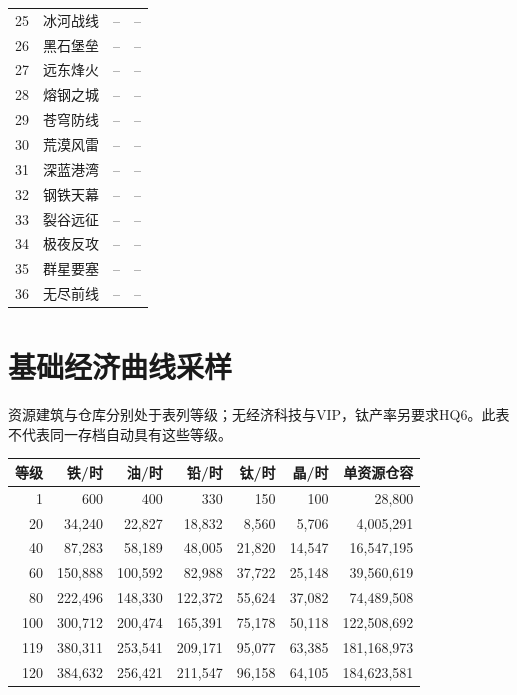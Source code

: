 {\begin{small}
\begin{longtable}{@{}rP{48mm}P{24mm}P{48mm}@{}}
25 & 冰河战线 & -- & -- \\
26 & 黑石堡垒 & -- & -- \\
27 & 远东烽火 & -- & -- \\
28 & 熔钢之城 & -- & -- \\
29 & 苍穹防线 & -- & -- \\
30 & 荒漠风雷 & -- & -- \\
31 & 深蓝港湾 & -- & -- \\
32 & 钢铁天幕 & -- & -- \\
33 & 裂谷远征 & -- & -- \\
34 & 极夜反攻 & -- & -- \\
35 & 群星要塞 & -- & -- \\
36 & 无尽前线 & -- & -- \\
\bottomrule
\end{longtable}
\end{small}
}
\clearpage
\section{基础经济曲线采样}
资源建筑与仓库分别处于表列等级；无经济科技与VIP，钛产率另要求HQ6。此表不代表同一存档自动具有这些等级。
\begin{small}
\begin{longtable}{@{}rrrrrrr@{}}
\toprule 等级 & 铁/时 & 油/时 & 铅/时 & 钛/时 & 晶/时 & 单资源仓容 \\
\midrule\endhead
1 & 600 & 400 & 330 & 150 & 100 & 28,800 \\
20 & 34,240 & 22,827 & 18,832 & 8,560 & 5,706 & 4,005,291 \\
40 & 87,283 & 58,189 & 48,005 & 21,820 & 14,547 & 16,547,195 \\
60 & 150,888 & 100,592 & 82,988 & 37,722 & 25,148 & 39,560,619 \\
80 & 222,496 & 148,330 & 122,372 & 55,624 & 37,082 & 74,489,508 \\
100 & 300,712 & 200,474 & 165,391 & 75,178 & 50,118 & 122,508,692 \\
119 & 380,311 & 253,541 & 209,171 & 95,077 & 63,385 & 181,168,973 \\
120 & 384,632 & 256,421 & 211,547 & 96,158 & 64,105 & 184,623,581 \\
\bottomrule
\end{longtable}
\end{small}
\Needspace{80mm}
